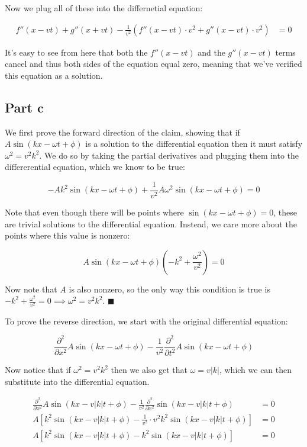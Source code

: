 \documentclass{article}
\theoremstyle{definition}
\numberwithin{equation}{section}
\numberwithin{definition}{section}
\begin{document}
Now we plug all of these into the differnetial equation:

\begin{align*}
    f''(x - vt) + g''(x + vt) - \frac{1}{v^2}(f''(x - vt) \cdot v^2 + g''(x - vt) \cdot v^2) &= 0
\end{align*}

It's easy to see from here that both the $f''(x - vt)$ and the $g''(x - vt)$ terms cancel and thus both sides of the equation equal zero, meaning that we've verified this equation as a solution. 

\subsection*{Part c}

We first prove the forward direction of the claim, showing that if $A \sin(kx - \omega t + \phi)$ is a solution to the differential equation then it must satisfy $\omega^2 = v^2k^2$. We do so by taking the partial derivatives and plugging them into the differerential equation, which we know to be true:

\[-Ak^2\sin(kx - \omega t + \phi) + \frac{1}{v^2}A\omega^2 \sin (kx - \omega t + \phi) = 0\]

Note that even though there will be points where $\sin(kx - \omega t + \phi) = 0$, these are trivial solutions to the differential equation. Instead, we care more about the points where this value is nonzero:

\[   A\sin(kx - \omega t + \phi)\left(-k^2 + \frac{\omega^2}{v^2}\right) = 0\]

Now note that $A$ is also nonzero, so the only way this condition is true is $-k^2 + \frac{\omega^2}{v^2} = 0 \implies \omega^2 = v^2k^2$. $\blacksquare$

\medskip

To prove the reverse direction, we start with the original differential equation:

\[ \frac{\partial^2}{\partial x^2} A\sin(kx - \omega t + \phi) - \frac{1}{v^2}\frac{\partial^2}{\partial t^2}A \sin(kx - \omega t + \phi)\]

Now notice that if $\omega^2 = v^2k^2$ then we also get that $\omega = v|k|$, which we can then substitute into the differential equation. 

\begin{align*}
    \frac{\partial^2}{\partial x^2} A \sin (kx - v|k|t + \phi) - \frac{1}{v^2} \frac{\partial^2}{\partial x^2} \sin (kx - v|k|t + \phi) &= 0\\
    A\left[k^2 \sin (kx - v|k|t + \phi) - \frac{1}{v^2} \cdot v^2k^2\sin(kx - v|k|t + \phi)\right] &= 0\\
    A\left[k^2 \sin (kx - v|k|t + \phi) - k^2 \sin (kx - v|k|t + \phi)\right] &= 0
\end{align*}
\end{document}
